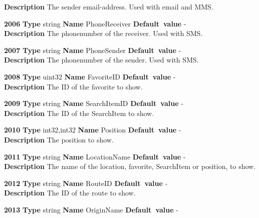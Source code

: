 \documentclass[a4paper]{article}
\begin{document}
\begin{list}{\textbf{ParamID}}{}
  \label{EmailSender}
  \textbf{Description} The sender email-address. Used with email and MMS.
\item \textbf{2006} \textbf{Type} string \textbf{Name} PhoneReceiver
                 \textbf{Default~value} - \\
  \label{PhoneReceiver}
  \textbf{Description} The phonenumber of the receiver. Used with SMS.
\item \textbf{2007} \textbf{Type} string \textbf{Name} PhoneSender
                 \textbf{Default~value} - \\
  \label{PhoneSender}
  \textbf{Description} The phonenumber of the sender. Used with SMS.
\item \textbf{2008} \textbf{Type} uint32 \textbf{Name} FavoriteID
                 \textbf{Default~value} - \\
  \label{FavoriteID}
  \textbf{Description} The ID of the favorite to show.
\item \textbf{2009} \textbf{Type} string \textbf{Name} SearchItemID
                 \textbf{Default~value} - \\
  \label{SearchItemID}
  \textbf{Description} The ID of the SearchItem to show.
\item \textbf{2010} \textbf{Type} int32,int32 \textbf{Name} Position
                 \textbf{Default~value} - \\
  \label{Position}
  \textbf{Description} The position to show.
\item \textbf{2011} \textbf{Type} string \textbf{Name} LocationName
                 \textbf{Default~value} - \\
  \label{LocationName}
  \textbf{Description} The name of the location, favorite, SearchItem
  or position, to show.
\item \textbf{2012} \textbf{Type} string \textbf{Name} RouteID
                 \textbf{Default~value} - \\
  \label{RouteID}
  \textbf{Description} The ID of the route to show.
\item \textbf{2013} \textbf{Type} string \textbf{Name} OriginName
                 \textbf{Default~value} - \\

\end{list}
\end{document}
